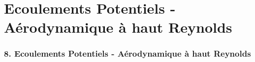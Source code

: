 
\part{Ecoulements Potentiels - Aérodynamique à haut Reynolds}


\section*{\bfseries 8. Ecoulements Potentiels - Aérodynamique à haut Reynolds}









%
%  
%
%


